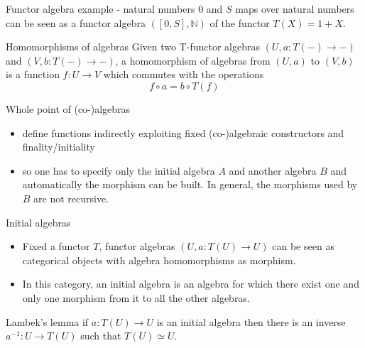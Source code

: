 \documentclass[presentation]{beamer}
\begin{document}
\begin{frame}[label={sec:org194998d}]{Functor algebra example - natural numbers}
\(0\) and \(S\) maps over natural numbers can be seen as a functor algebra
\(([0,S],\mathbb{N})\) of the functor \(T(X) = 1 + X\).
\end{frame}

\begin{frame}[label={sec:org440f597}]{Homomorphisms of algebras}
Given two T-functor algebras \((U, a: T(-) \rightarrow -)\) and \((V, b: T(-) \rightarrow -)\),
a homomorphism of algebras from \((U,a)\) to \((V,b)\) is a function \(f: U \rightarrow V\) which commutes
with the operations $$ f \circ a = b \circ T(f)$$
\end{frame}

\begin{frame}[label={sec:org6f6284c}]{Whole point of (co-)algebras}
\begin{itemize}
\item define functions indirectly exploiting fixed (co-)algebraic constructors
and finality/initiality
\item so one has to specify only the initial algebra \(A\) and another algebra \(B\)
and automatically the morphism can be built. In general, the morphisms
used by \(B\) are not recursive.
\end{itemize}
\end{frame}

\begin{frame}[label={sec:org62c325a}]{Initial algebras}
\begin{itemize}
\item Fixed a functor \(T\), functor algebras \((U, a: T(U) \rightarrow U)\) can be
seen as categorical objects with algebra homomorphisms as morphism.

\item In this category, an \alert{initial algebra} is an algebra for which there exist
one and only one morphism from it to all the other algebras.
\end{itemize}
\end{frame}

\begin{frame}[label={sec:org635e52a}]{Lambek's lemma}
if \(a: T(U) \rightarrow U\) is an initial algebra then there is an
inverse \(a^{-1}: U \rightarrow T(U)\) such that \(T(U) \simeq U\).
\end{frame}
\end{document}
